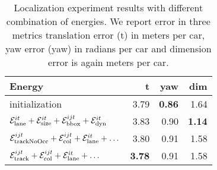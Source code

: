 \begin{table}
  \centering
  \begin{tabular}{lrrr}
    \toprule
    Energy & t & yaw & dim \\
    \midrule
    initialization                                                                                  & 3.79 & \textbf{0.86} & 1.64 \\
    $\mathcal{E}^{it}_{\text{lane}}+\mathcal{E}^{it}_{\text{size}}+\mathcal{E}^{ijt}_{\text{bbox}}+\mathcal{E}^{it}_{\text{dyn}}                                       $ & 3.83 & 0.90 & \textbf{1.14} \\
    $\mathcal{E}^{ijt}_{\text{trackNoOcc}}+\mathcal{E}^{ijt}_{\text{col}} + \mathcal{E}^{it}_{\text{lane}} + \dots$  & 3.80 & 0.91 & 1.58 \\
    $\mathcal{E}^{ijt}_{\text{track}}+\mathcal{E}^{ijt}_{\text{col}} + \mathcal{E}^{it}_{\text{lane}} + \dots$ & \textbf{3.78} & 0.91 & 1.58 \\
    \bottomrule
  \end{tabular}
  \caption{Localization experiment results with different combination of energies. We report error in three metrics translation error (t) in meters per car, yaw error (yaw) in radians per car and dimension error is again meters per car.}
\end{table}
